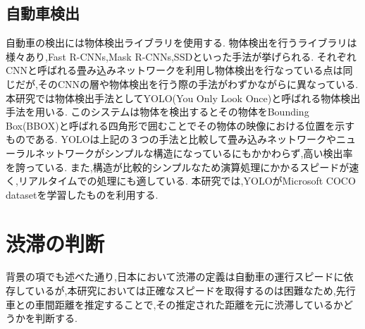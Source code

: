 \subsection{自動車検出}
自動車の検出には物体検出ライブラリを使用する.
物体検出を行うライブラリは様々あり,Fast R-CNNs,Mask R-CNNs,SSDといった手法が挙げられる.
それぞれCNNと呼ばれる畳み込みネットワークを利用し物体検出を行なっている点は同じだが,そのCNNの層や物体検出を行う際の手法がわずかながらに異なっている.
本研究では物体検出手法としてYOLO(You Only Look Once)と呼ばれる物体検出手法を用いる.
このシステムは物体を検出するとその物体をBounding Box(BBOX)と呼ばれる四角形で囲むことでその物体の映像における位置を示すものである.
YOLOは上記の３つの手法と比較して畳み込みネットワークやニューラルネットワークがシンプルな構造になっているにもかかわらず,高い検出率を誇っている.
また,構造が比較的シンプルなため演算処理にかかるスピードが速く,リアルタイムでの処理にも適している.
本研究では,YOLOがMicrosoft COCO datasetを学習したものを利用する.


\section{渋滞の判断}
背景の項でも述べた通り,日本において渋滞の定義は自動車の運行スピードに依存しているが,本研究においては正確なスピードを取得するのは困難なため,先行車との車間距離を推定することで,その推定された距離を元に渋滞しているかどうかを判断する.

